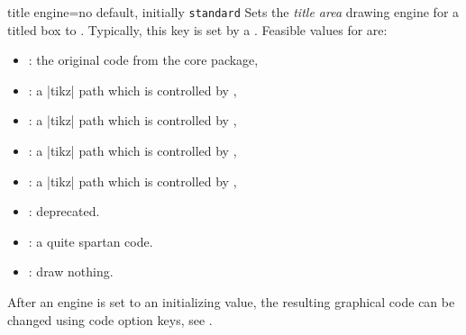 \begin{docTcbKey}{title engine}{=}{no default, initially \texttt{standard}}
  Sets the \emph{title area} drawing engine for a titled box to .
  Typically, this key is set by a .
  Feasible values for  are:
  \begin{itemize}
  \item{}: the original code from the core package,
  \item{}: a |tikz| path which is controlled by ,
  \item{}: a |tikz| path which is controlled by ,
  \item{}: a |tikz| path which is controlled by ,
  \item{}: a |tikz| path which is controlled by ,
  \item{}: deprecated.
  \item{}: a quite spartan code.
  \item{}: draw nothing.
  \end{itemize}
\end{docTcbKey}

\begin{marker}
After an engine is set to an initializing value, the resulting graphical
code can be changed using code option keys, see .
\end{marker}

